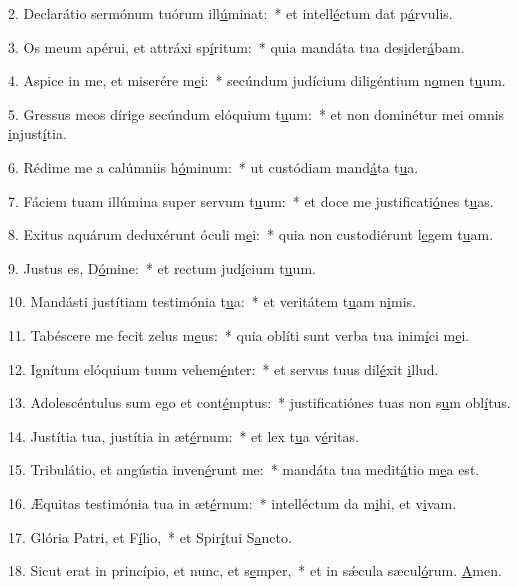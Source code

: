 2. Declarátio sermónum tuórum ill\uline{ú}minat:~* et intell\uline{é}ctum dat p\uline{á}rvulis.\par 
3. Os meum apérui, et attráxi sp\uline{í}ritum:~* quia mandáta tua des\uline{i}der\uline{á}bam.\par 
4. Aspice in me, et miserére m\uline{e}i:~* secúndum judícium diligéntium n\uline{o}men t\uline{u}um.\par 
5. Gressus meos dírige secúndum elóquium t\uline{u}um:~* et non dominétur mei omnis \uline{i}njust\uline{í}tia.\par 
6. Rédime me a calúmniis h\uline{ó}minum:~* ut custódiam mand\uline{á}ta t\uline{u}a.\par 
7. Fáciem tuam illúmina super servum t\uline{u}um:~* et doce me justificati\uline{ó}nes t\uline{u}as.\par 
8. Exitus aquárum deduxérunt óculi m\uline{e}i:~* quia non custodiérunt l\uline{e}gem t\uline{u}am.\par 
9. Justus es, D\uline{ó}mine:~* et rectum jud\uline{í}cium t\uline{u}um.\par 
10. Mandásti justítiam testimónia t\uline{u}a:~* et veritátem t\uline{u}am n\uline{i}mis.\par 
11. Tabéscere me fecit zelus m\uline{e}us:~* quia oblíti sunt verba tua inim\uline{í}ci m\uline{e}i.\par 
12. Ignítum elóquium tuum vehem\uline{é}nter:~* et servus tuus dil\uline{é}xit \uline{i}llud.\par 
13. Adolescéntulus sum ego et cont\uline{é}mptus:~* justificatiónes tuas non s\uline{u}m obl\uline{í}tus.\par 
14. Justítia tua, justítia in æt\uline{é}rnum:~* et lex t\uline{u}a v\uline{é}ritas.\par 
15. Tribulátio, et angústia inven\uline{é}runt me:~* mandáta tua medit\uline{á}tio m\uline{e}a est.\par 
16. Æquitas testimónia tua in æt\uline{é}rnum:~* intelléctum da m\uline{i}hi, et v\uline{i}vam.\par 
17. Glória Patri, et F\uline{í}lio,~* et Spir\uline{í}tui S\uline{a}ncto.\par 
18. Sicut erat in princípio, et nunc, et s\uline{e}mper,~* et in sǽcula sæcul\uline{ó}rum. \uline{A}men.\par 
